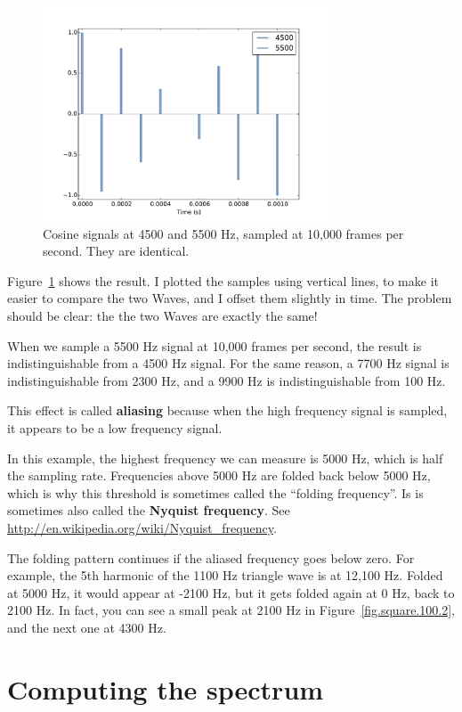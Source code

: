 \documentclass[12pt]{book}
\begin{document}
\begin{figure}
\centerline{\includegraphics[height=2.5in]{figs/aliasing1.pdf}}
\caption{Cosine signals at 4500 and 5500 Hz, sampled at 10,000 frames
per second.  They are identical.}
\label{fig.aliasing1}
\end{figure}

Figure~\ref{fig.aliasing1} shows the result.  I plotted the
samples using vertical lines, to make it easier to compare the
two Waves, and I offset them slightly in time.  The problem
should be clear: the
the two Waves are exactly the same!

When we sample a 5500 Hz signal at 10,000 frames per second, the
result is indistinguishable from a 4500 Hz signal.
For the same reason, a 7700 Hz signal is indistinguishable
from 2300 Hz, and a 9900 Hz is indistinguishable from 100 Hz.

This effect is called {\bf aliasing} because when the high frequency
signal is sampled, it appears to be a low frequency signal.

In this example, the highest frequency we can measure is 5000 Hz,
which is half the sampling rate.  Frequencies above 5000 Hz are folded
back below 5000 Hz, which is why this threshold is sometimes called
the ``folding frequency''.  Is is sometimes also called the {\bf
  Nyquist frequency}.  See
\url{http://en.wikipedia.org/wiki/Nyquist_frequency}.

The folding pattern continues if the aliased frequency goes below
zero.  For example, the 5th harmonic of the 1100 Hz triangle wave is
at 12,100 Hz.  Folded at 5000 Hz, it would appear at -2100 Hz, but it
gets folded again at 0 Hz, back to 2100 Hz.  In fact, you can see a
small peak at 2100 Hz in Figure~\ref{fig.square.100.2}, and the next
one at 4300 Hz.


\section{Computing the spectrum}
\end{document}
